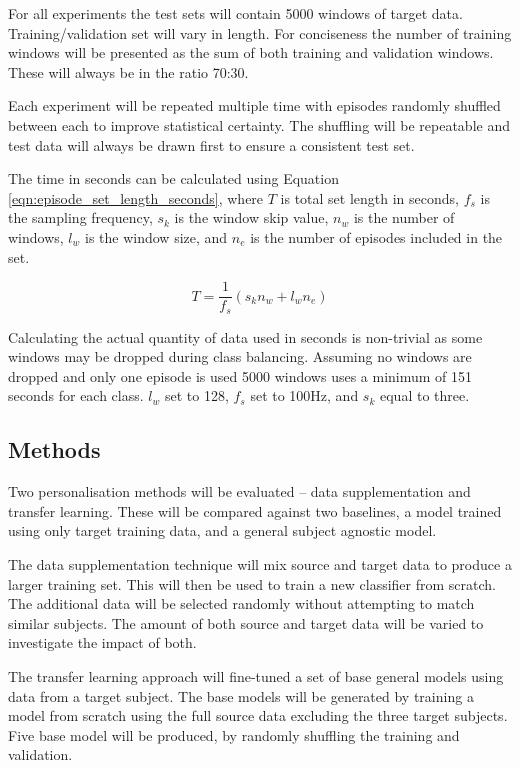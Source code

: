 For all experiments the test sets will contain 5000 windows of target data. Training/validation set will vary in length. For conciseness the number of training windows will be presented as the sum of both training and validation windows. These will always be in the ratio 70:30. 

Each experiment will be repeated multiple time with episodes randomly shuffled between each to improve statistical certainty. The shuffling will be repeatable and test data will always be drawn first to ensure a consistent test set.

The time in seconds can be calculated using Equation \ref{eqn:episode_set_length_seconds}, where $T$ is total set length in seconds, $f_s$ is the sampling frequency, $s_k$ is the window skip value, $n_w$ is the number of windows, $l_w$ is the window size, and $n_e$ is the number of episodes included in the set.

\begin{equation}
    T = \frac{1}{f_s}(s_k n_w + l_w n_e)
    \label{eqn:episode_set_length_seconds}
\end{equation}

Calculating the actual quantity of data used in seconds is non-trivial as some windows may be dropped during class balancing. Assuming no windows are dropped and only one episode is used 5000 windows uses a minimum of 151 seconds for each class. $l_w$ set to 128, $f_s$ set to 100Hz, and $s_k$ equal to three.

\subsection{ Methods}
Two personalisation methods will be evaluated -- data supplementation and transfer learning. These will be compared against two baselines, a model trained using only target training data, and a general subject agnostic model.

The data supplementation technique will mix source and target data to produce a larger training set. This will then be used to train a new classifier from scratch. The additional data will be selected randomly without attempting to match similar subjects. The amount of both source and target data will be varied to investigate the impact of both.

The transfer learning approach will fine-tuned a set of base general models using data from a target subject. The base models will be generated by training a model from scratch using the full source data excluding the three target subjects. Five base model will be produced, by randomly shuffling the training and validation.


